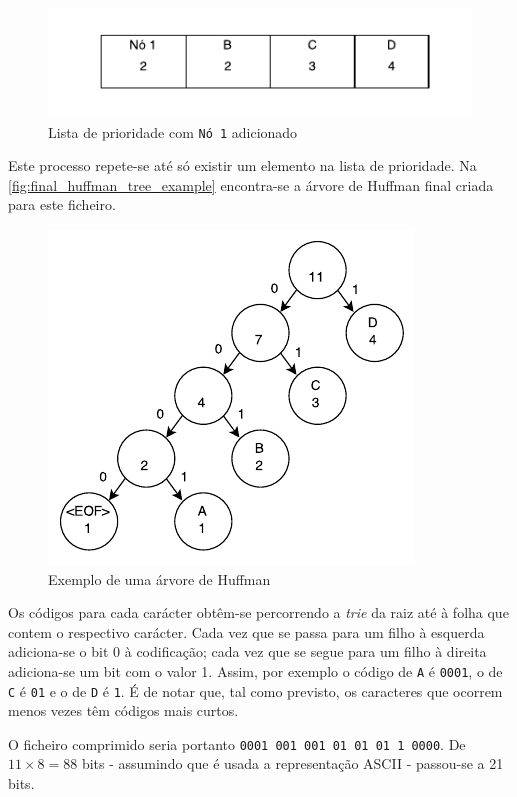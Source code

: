 \documentclass[a4paper]{article}
\begin{document}
  \begin{figure}[H]
    \centering
    \includegraphics[width=.65\textwidth]{img/prio_list_2}
    \caption{Lista de prioridade com \texttt{Nó 1} adicionado}
    \label{fig:prio_list_2}
  \end{figure}

  Este processo repete-se até só existir um elemento na lista de prioridade. Na \autoref{fig:final_huffman_tree_example} encontra-se a árvore de Huffman final criada para este ficheiro.

	\begin{figure}[H]
		\centering
		\includegraphics[width=.65\textwidth]{img/huffman_tree_example}
		\caption{Exemplo de uma árvore de Huffman}
		\label{fig:final_huffman_tree_example}
	\end{figure}

	Os códigos para cada carácter obtêm-se percorrendo a \textit{trie} da raiz até à folha que contem o respectivo carácter. Cada vez que se passa para um filho à esquerda adiciona-se o bit 0 à codificação; cada vez que se segue para um filho à direita adiciona-se um bit com o valor 1. Assim, por exemplo o código de \texttt{A} é \texttt{0001}, o de \texttt{C} é \texttt{01} e o de \texttt{D} é \texttt{1}. É de notar que, tal como previsto, os caracteres que ocorrem menos vezes têm códigos mais curtos.

	O ficheiro comprimido seria portanto \texttt{0001 001 001 01 01 01 1 0000}. De $11 \times 8 = 88$ bits - assumindo que é usada a representação ASCII - passou-se a 21 bits.
\end{document}
